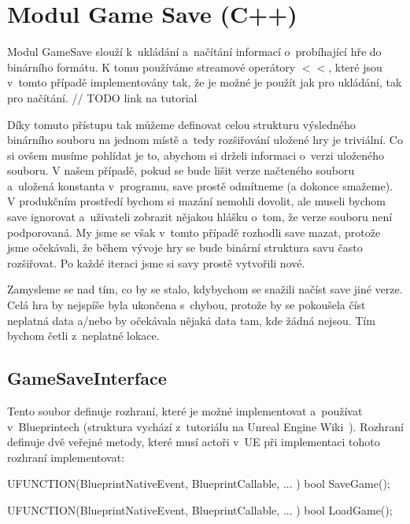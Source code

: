 
\section{Modul Game Save (C++)}

Modul GameSave slouží k~ukládání a~načítání informací o~probíhající hře do binárního formátu. K tomu používáme streamové operátory $<<$, které jsou v~tomto případě implementovány tak, že je možné je použít jak pro ukládání, tak pro načítání. // TODO link na tutorial

Díky tomuto přístupu tak můžeme definovat celou strukturu výsledného binárního souboru na jednom místě a~tedy rozšiřování uložené hry je triviální. Co si ovšem musíme pohlídat je to, abychom si drželi informaci o~verzi uloženého souboru. V našem případě, pokud se bude lišit verze načteného souboru a~uložená konstanta v~programu, save prostě odmítneme (a dokonce smažeme). V produkčním prostředí bychom si mazání nemohli dovolit, ale museli bychom save ignorovat a~uživateli zobrazit nějakou hlášku o~tom, že verze souboru není podporovaná. My jsme se však v~tomto případě rozhodli save mazat, protože jsme očekávali, že během vývoje hry se bude binární struktura savu často rozšiřovat. Po každé iteraci jsme si savy prostě vytvořili nové.

Zamysleme se nad tím, co by se stalo, kdybychom se snažili načíst save jiné verze. Celá hra by nejspíše byla ukončena s~chybou, protože by se pokoušela číst neplatná data a/nebo by očekávala nějaká data tam, kde žádná nejsou. Tím bychom četli z~neplatné lokace.




\subsection{GameSaveInterface}

Tento soubor definuje rozhraní, které je možné implementovat a~používat v~Blueprintech (struktura vychází z~tutoriálu na Unreal Engine Wiki~\citep{ue_interfaces_tut}). Rozhraní definuje dvě veřejné metody, které musí actoři v~UE při implementaci tohoto rozhraní implementovat:

\begin{code}
UFUNCTION(BlueprintNativeEvent, BlueprintCallable, ... )
	bool SaveGame();

UFUNCTION(BlueprintNativeEvent, BlueprintCallable, ... )
	bool LoadGame();
\end{code}

